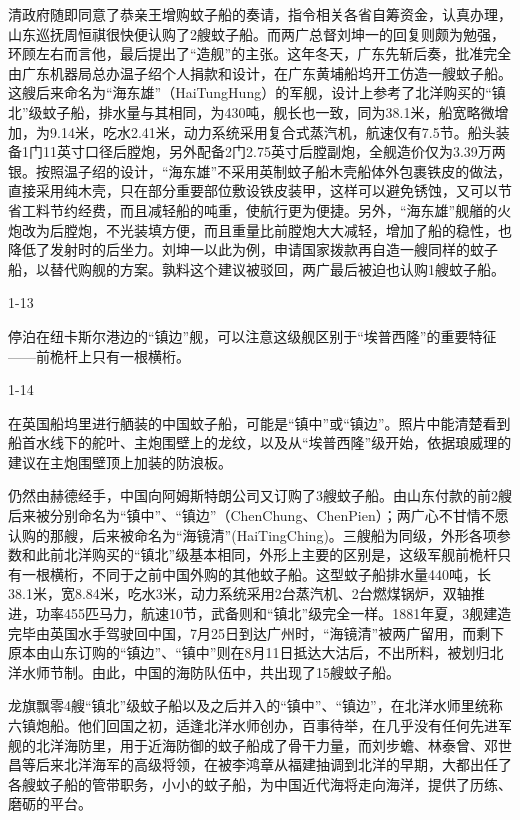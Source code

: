 \documentclass[12pt,UTF8]{ctexbook}
\begin{document}
清政府随即同意了恭亲王增购蚊子船的奏请，指令相关各省自筹资金，认真办理，山东巡抚周恒祺很快便认购了2艘蚊子船。而两广总督刘坤一的回复则颇为勉强，环顾左右而言他，最后提出了“造舰”的主张。这年冬天，广东先斩后奏，批准完全由广东机器局总办温子绍个人捐款和设计，在广东黄埔船坞开工仿造一艘蚊子船。这艘后来命名为“海东雄”（HaiTungHung）的军舰，设计上参考了北洋购买的“镇北”级蚊子船，排水量与其相同，为430吨，舰长也一致，同为38.1米，船宽略微增加，为9.14米，吃水2.41米，动力系统采用复合式蒸汽机，航速仅有7.5节。船头装备1门11英寸口径后膛炮，另外配备2门2.75英寸后膛副炮，全舰造价仅为3.39万两银。按照温子绍的设计，“海东雄”不采用英制蚊子船木壳船体外包裹铁皮的做法，直接采用纯木壳，只在部分重要部位敷设铁皮装甲，这样可以避免锈蚀，又可以节省工料节约经费，而且减轻船的吨重，使航行更为便捷。另外，“海东雄”舰艏的火炮改为后膛炮，不光装填方便，而且重量比前膛炮大大减轻，增加了船的稳性，也降低了发射时的后坐力。刘坤一以此为例，申请国家拨款再自造一艘同样的蚊子船，以替代购舰的方案。孰料这个建议被驳回，两广最后被迫也认购1艘蚊子船。

1-13

停泊在纽卡斯尔港边的“镇边”舰，可以注意这级舰区别于“埃普西隆”的重要特征——前桅杆上只有一根横桁。

1-14

在英国船坞里进行舾装的中国蚊子船，可能是“镇中”或“镇边”。照片中能清楚看到船首水线下的舵叶、主炮围壁上的龙纹，以及从“埃普西隆”级开始，依据琅威理的建议在主炮围壁顶上加装的防浪板。

仍然由赫德经手，中国向阿姆斯特朗公司又订购了3艘蚊子船。由山东付款的前2艘后来被分别命名为“镇中”、“镇边”（ChenChung、ChenPien）；两广心不甘情不愿认购的那艘，后来被命名为“海镜清”(HaiTingChing)。三艘船为同级，外形各项参数和此前北洋购买的“镇北”级基本相同，外形上主要的区别是，这级军舰前桅杆只有一根横桁，不同于之前中国外购的其他蚊子船。这型蚊子船排水量440吨，长38.1米，宽8.84米，吃水3米，动力系统采用2台蒸汽机、2台燃煤锅炉，双轴推进，功率455匹马力，航速10节，武备则和“镇北”级完全一样。1881年夏，3舰建造完毕由英国水手驾驶回中国，7月25日到达广州时，“海镜清”被两广留用，而剩下原本由山东订购的“镇边”、“镇中”则在8月11日抵达大沽后，不出所料，被划归北洋水师节制。由此，中国的海防队伍中，共出现了15艘蚊子船。

龙旗飘零4艘“镇北”级蚊子船以及之后并入的“镇中”、“镇边”，在北洋水师里统称六镇炮船。他们回国之初，适逢北洋水师创办，百事待举，在几乎没有任何先进军舰的北洋海防里，用于近海防御的蚊子船成了骨干力量，而刘步蟾、林泰曾、邓世昌等后来北洋海军的高级将领，在被李鸿章从福建抽调到北洋的早期，大都出任了各艘蚊子船的管带职务，小小的蚊子船，为中国近代海将走向海洋，提供了历练、磨砺的平台。
\end{document}

